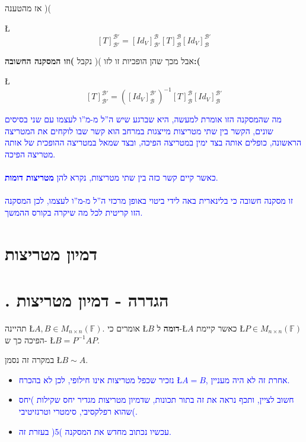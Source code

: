 \documentclass[english,hebrew]{article}
\newcommand{\sqrmn}{M_{n\times n}(\mathbb{F})}
\begin{document}
אז מהטענה ){\endL}(

\L{%
\[
[T]_{\mathcal{B}'}^{\mathcal{B}'}=[Id_{V}]_{\mathcal{B}'}^{\mathcal{B}}[T]_{\mathcal{B}}^{\mathcal{B}}[Id_{V}]_{\mathcal{B}}^{\mathcal{B}'}
\]
}%

אבל מכך שהן הופכיות זו לזו ){\endL}( נקבל \textbf{)וזו המסקנה
החשובה:(}

\L{%
\[
[T]_{\mathcal{B}'}^{\mathcal{B}'}=\left([Id_{V}]_{\mathcal{B}}^{\mathcal{B}'}\right)^{-1}[T]_{\mathcal{B}}^{\mathcal{B}}[Id_{V}]_{\mathcal{B}}^{\mathcal{B}'}
\]
}%

\medskip{}
\textcolor{blue}{מה שהמסקנה הזו אומרת למעשה, היא שברגע שיש ה\textquotedblright ל
מ-מ\textquotedblright ו לעצמו עם שני בסיסים שונים, הקשר בין שתי מטריצות
מייצגות במרחב הוא קשר שבו לוקחים את המטריצה הראשונה, כופלים אותה בצד
ימין במטריצה הפיכה, ובצד שמאל במטריצה ההופכית של אותה מטריצה הפיכה.}\\
\textcolor{blue}{}\\
\textcolor{blue}{כאשר קיים קשר כזה בין שתי מטריצות, נקרא להן }\textbf{\textcolor{blue}{מטריצות
דומות}}\textcolor{blue}{.}\\
\textcolor{blue}{}\\
\textcolor{blue}{זו מסקנה חשובה כי בלינארית }\textcolor{blue}{{}\endL}\textcolor{blue}{{}
באה לידי ביטוי באופן מרכזי ה\textquotedblright ל מ-מ\textquotedblright ו
לעצמו, לכן המסקנה הזו קריטית לכל מה שיקרה בקורס ההמשך.}\\

\section{דמיון מטריצות}

\section{{\endL}. הגדרה - דמיון מטריצות}

תהיינה \L{$A,B\in\sqrmn$}. אומרים כי \L{$B$} \textbf{דומה} ל-\L{$A$}
כאשר קיימת \L{$P\in\sqrmn$} הפיכה כך ש- \L{$B=P^{-1}AP$}.

במקרה זה נסמן \L{$B\sim A$}.
\begin{itemize}
\item \textcolor{blue}{נזכיר שכפל מטריצות אינו חילופי, לכן לא בהכרח \L{$A=B$},
אחרת זה לא היה מעניין.}
\item \textcolor{blue}{חשוב לציין, ותכף נראה את זה בתור תכונות, שדמיון מטריצות
מגדיר יחס שקילות )יחס שהוא רפלקסיבי, סימטרי וטרנזיטיבי(.}
\item \textcolor{blue}{עכשיו נכתוב מחדש את המסקנה )5( בעזרת זה.}
\end{itemize}
\end{document}
